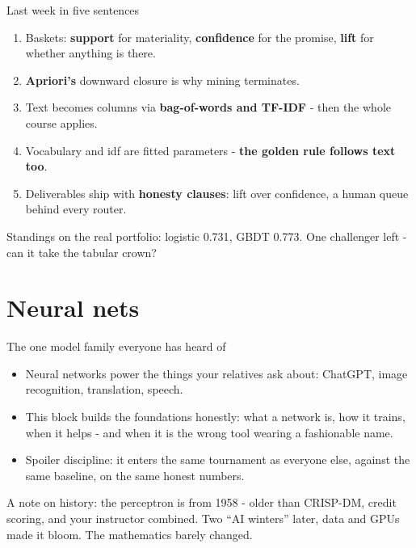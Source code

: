 \documentclass[10pt,aspectratio=169]{beamer}
\begin{document}
\begin{frame}{Last week in five sentences}
  \begin{enumerate}
    \item Baskets: \textbf{support} for materiality, \textbf{confidence}
          for the promise, \textbf{lift} for whether anything is there.
    \item \textbf{Apriori's} downward closure is why mining terminates.
    \item Text becomes columns via \textbf{bag-of-words and TF-IDF} -
          then the whole course applies.
    \item Vocabulary and idf are fitted parameters - \textbf{the golden
          rule follows text too}.
    \item Deliverables ship with \textbf{honesty clauses}: lift over
          confidence, a human queue behind every router.
  \end{enumerate}
  \vspace{0.5em}
  \begin{center}
    Standings on the real portfolio: logistic \alert{0.731}, GBDT
    \alert{0.773}. One challenger left - can it take the tabular crown?
  \end{center}
\end{frame}

\section{Neural nets}

\begin{frame}{The one model family everyone has heard of}
  \begin{itemize}
    \item Neural networks power the things your relatives ask about:
          ChatGPT, image recognition, translation, speech.
    \item This block builds the \alert{foundations honestly}: what a
          network is, how it trains, when it helps - and when it is the
          wrong tool wearing a fashionable name.
    \item Spoiler discipline: it enters the same tournament as everyone
          else, against the same baseline, on the same honest numbers.
  \end{itemize}
  \vspace{0.5em}
  \begin{center}\small
    A note on history: the perceptron is from \alert{1958} - older than
    CRISP-DM, credit scoring, and your instructor combined. Two ``AI
    winters'' later, data and GPUs made it bloom. The mathematics barely
    changed.
  \end{center}
\end{frame}
\end{document}
